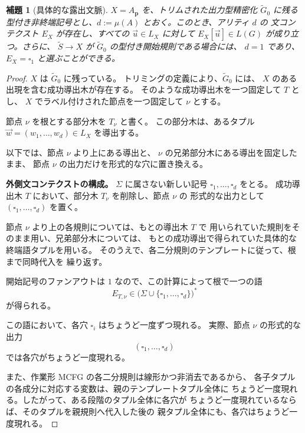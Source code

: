 \documentclass[11pt,a4paper]{ltjsarticle}
\newtheorem{lemma}[theorem]{補題}
\theoremstyle{remark}
\newcommand{\tuple}[1]{\vec{#1}}
\newcommand{\blank}{\square}
\begin{document}
\begin{lemma}[具体的な露出文脈]
\label{lem:exposing-contexts}
\(X=A_{\mathbf p}\) を、トリムされた出力型精密化 \(\widetilde G_0\) に残る
型付き非終端記号とし、\(d:=\mu(A)\) とおく。このとき、アリティ \(d\) の
文コンテクスト \(E_X\) が存在し、すべての \(\tuple u\in L_X\) に対して
\(E_X[\tuple u]\in L(G)\) が成り立つ。さらに、
\(\widetilde S\to X\) が \(\widetilde G_0\) の型付き開始規則である場合には、
\(d=1\) であり、\(E_X=\blank_1\) と選ぶことができる。
\end{lemma}

\begin{proof}
\(X\) は \(\widetilde G_0\) に残っている。
トリミングの定義により、\(\widetilde G_0\) には、
\(X\) のある出現を含む成功導出木が存在する。
そのような成功導出木を一つ固定して \(T\) とし、
\(X\) でラベル付けされた節点を一つ固定して \(\nu\) とする。

節点 \(\nu\) を根とする部分木を \(T_\nu\) と書く。
この部分木は、あるタプル \(\tuple w=(w_1,\ldots,w_d)\in L_X\) を導出する。

以下では、節点 \(\nu\) より上にある導出と、
\(\nu\) の兄弟部分木にある導出を固定したまま、
節点 \(\nu\) の出力だけを形式的な穴に置き換える。

\medskip
\noindent
\textbf{外側文コンテクストの構成。}
\(\Sigma\) に属さない新しい記号 \(\blank_1,\ldots,\blank_d\) をとる。
成功導出木 \(T\) において、部分木 \(T_\nu\) を削除し、節点 \(\nu\) の
形式的な出力として \((\blank_1,\ldots,\blank_d)\) を置く。

節点 \(\nu\) より上の各規則については、もとの導出木 \(T\) で
用いられていた規則をそのまま用い、兄弟部分木については、
もとの成功導出で得られていた具体的な終端語タプルを用いる。
そのうえで、各二分規則のテンプレートに従って、根まで同時代入を
繰り返す。

開始記号のファンアウトは \(1\) なので、この計算によって根で一つの語
\[
  E_{T,\nu}
  \in
  \bigl(
    \Sigma\cup\{\blank_1,\ldots,\blank_d\}
  \bigr)^*
\]
が得られる。

この語において、各穴
\(\blank_i\) はちょうど一度ずつ現れる。
実際、節点 \(\nu\) の形式的な出力
\[
  (\blank_1,\ldots,\blank_d)
\]
では各穴がちょうど一度現れる。

また、作業形 MCFG の各二分規則は線形かつ非消去であるから、
各子タプルの各成分に対応する変数は、親のテンプレートタプル全体に
ちょうど一度現れる。したがって、ある段階のタプル全体に各穴が
ちょうど一度現れているならば、そのタプルを親規則へ代入した後の
親タプル全体にも、各穴はちょうど一度現れる。


\end{proof}
\end{document}
